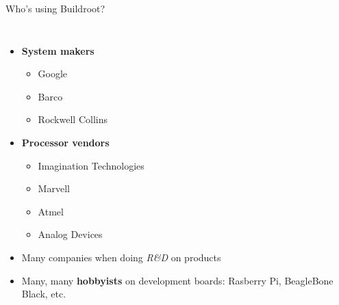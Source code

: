 \begin{frame}{Who's using Buildroot?}
  \begin{columns}
    \begin{itemize}
    \item {\bf System makers}
      \begin{itemize}
      \item Google
      \item Barco
      \item Rockwell Collins
      \end{itemize}
    \item {\bf Processor vendors}
      \begin{itemize}
      \item Imagination Technologies
      \item Marvell
      \item Atmel
      \item Analog Devices
      \end{itemize}
    \item Many companies when doing {\em R\&D} on products
    \item Many, many {\bf hobbyists} on development boards:
      Rasberry Pi, BeagleBone Black, etc.
  \end{itemize}
  \\
  \\

\end{columns}
\end{frame}
